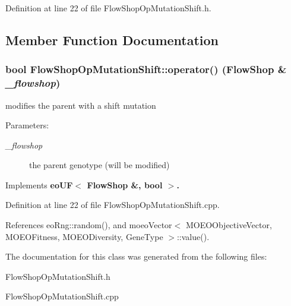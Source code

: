 Definition at line 22 of file Flow\-Shop\-Op\-Mutation\-Shift.h.

\subsection{Member Function Documentation}
\subsubsection{\setlength{\rightskip}{0pt plus 5cm}bool Flow\-Shop\-Op\-Mutation\-Shift::operator() (\bf{Flow\-Shop} \& {\em \_\-flowshop})\hspace{0.3cm}{\tt  [virtual]}}\label{classFlowShopOpMutationShift_c000b017e75ddee3b6fe9db8ea5ddd5b}


modifies the parent with a shift mutation 

\begin{Desc}
\item[Parameters:]
\begin{description}
\item[{\em \_\-flowshop}]the parent genotype (will be modified) \end{description}
\end{Desc}


Implements \bf{eo\-UF$<$ Flow\-Shop \&, bool $>$}.

Definition at line 22 of file Flow\-Shop\-Op\-Mutation\-Shift.cpp.

References eo\-Rng::random(), and moeo\-Vector$<$ MOEOObjective\-Vector, MOEOFitness, MOEODiversity, Gene\-Type $>$::value().

The documentation for this class was generated from the following files:\begin{CompactItemize}
\item 
Flow\-Shop\-Op\-Mutation\-Shift.h\item 
Flow\-Shop\-Op\-Mutation\-Shift.cpp\end{CompactItemize}
